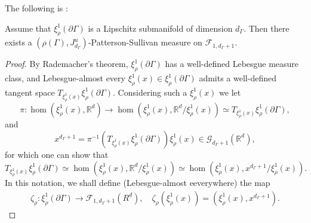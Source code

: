 \documentclass{report}
\begin{document}
The following is \cite[Proposition 6.4]{pozzetti_anosov_2023}:
\begin{proposition}
Assume that $\xi^1_\rho(\partial \Gamma)$ is a Lipschitz submanifold of dimension $d_\Gamma$.
Then there exists a $(\rho(\Gamma), J_{d_\Gamma}^u)$-Patterson-Sullivan measure on $\mathcal F_{1,d_\Gamma + 1}$.
\end{proposition}
\begin{proof}
    By Rademacher's theorem, $\xi^1_\rho(\partial \Gamma)$ has a well-defined Lebesgue measure class, and Lebesgue-almost every $\xi^1_\rho(x) \in \xi^1_\rho(\partial \Gamma)$ admits a well-defined tangent space $T_{\xi^1_\rho(x)} \xi^1_\rho(\partial \Gamma)$.
    Considering such a $\xi^1_\rho(x)$ we let
    \[
        \pi : \hom(\xi^1_\rho(x), \mathbb R^d) \to \hom(\xi^1_\rho(x), \mathbb R^d/\xi^1_\rho(x)) \simeq T_{\xi^1_\rho(x)} \xi^1_\rho(\partial \Gamma),
    \]
    and
    \[
        x^{d_\Gamma + 1} = \pi^{-1} (T_{\xi^1_\rho(x)} \xi^1_\rho(\partial \Gamma)) \xi^1_\rho(x) \in 
        \mathcal G_{d_\Gamma + 1} (\mathbb R^d),
    \]
    for which one can show that
    \[
        T_{\xi^1_\rho(x)} \xi^1_\rho(\partial \Gamma) \simeq 
        \hom(\xi^1_\rho(x), \mathbb R^d / \xi^1_\rho(x)) \simeq
        \hom(\xi^1_\rho(x), x^{d_\Gamma + 1} / \xi^1_\rho(x)).
    \]
    In this notation, we shall define (Lebesgue-almost eeverywhere) the map
    \begin{align*}
        \zeta_\rho: \xi_\rho^1(\partial \Gamma) \to \mathcal F_{1, d_\Gamma + 1} (R^d), \quad 
        \zeta_\rho(\xi_\rho^1(x)) = (\xi_\rho^1(x), x^{d_\Gamma + 1}).
    \end{align*}


\end{proof}
\end{document}

